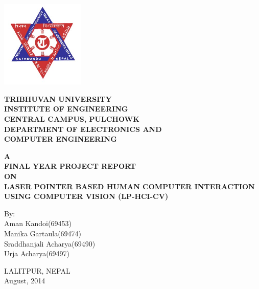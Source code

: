 \begin{titlepage}
    \begin{center}
        \vspace*{0.5cm}
        
        \begin{center}
        \includegraphics[width=0.3\textwidth]{logo}
        \end{center}
        
        \large
        {\textbf{TRIBHUVAN UNIVERSITY} \\
        \textbf{INSTITUTE OF ENGINEERING} \\
        \textbf{CENTRAL CAMPUS, PULCHOWK}\\
        \textbf{DEPARTMENT OF ELECTRONICS AND \\COMPUTER ENGINEERING}\\}
        
        \vspace{2cm}
        
        \normalsize
        \textbf{A \\FINAL YEAR PROJECT REPORT\\ ON\\
       LASER POINTER BASED HUMAN­ COMPUTER INTERACTION USING COMPUTER VISION (LP-­HCI-­CV)}

		\vspace{1.5cm}
        
        By:\\
        Aman Kandoi(69453)\\
Manika Gartaula(69474)\\
Sraddhanjali Acharya(69490)\\
Urja Acharya(69497)\\

        
        \vspace{2cm}
        
        
LALITPUR, NEPAL\\
August, 2014

        
        
    \end{center}
\end{titlepage}